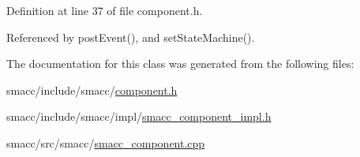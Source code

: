 Definition at line 37 of file component.\+h.



Referenced by post\+Event(), and set\+State\+Machine().



The documentation for this class was generated from the following files\+:\begin{DoxyCompactItemize}
\item 
smacc/include/smacc/\hyperlink{component_8h}{component.\+h}\item 
smacc/include/smacc/impl/\hyperlink{smacc__component__impl_8h}{smacc\+\_\+component\+\_\+impl.\+h}\item 
smacc/src/smacc/\hyperlink{smacc__component_8cpp}{smacc\+\_\+component.\+cpp}\end{DoxyCompactItemize}
